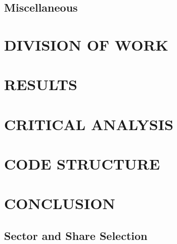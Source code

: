 \documentclass[10pt,twocolumn]{witseiepaper}
\begin{document}
\subsection{Miscellaneous}




\section{DIVISION OF WORK}

\section{RESULTS}\label{results}

\section{CRITICAL ANALYSIS}

\section{CODE STRUCTURE}

\section{CONCLUSION}


%



\newpage

\begin{appendix}
	
\section{Sector and Share Selection}


\end{appendix}

\end{document}
